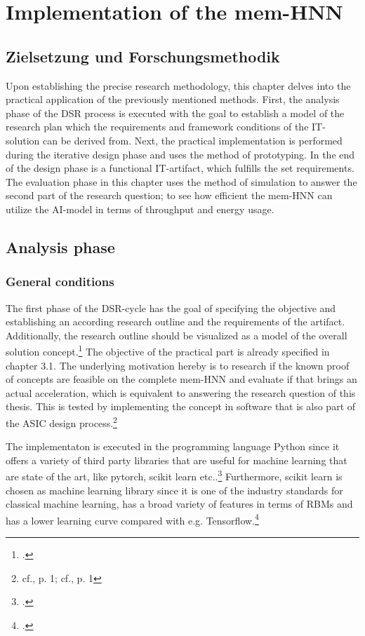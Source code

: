 \chapter{Implementation of the mem-HNN}

\section{Zielsetzung und Forschungsmethodik}
Upon establishing the precise research methodology, this chapter delves into the practical application of the previously mentioned methods.
First, the analysis phase of the \ac{DSR} process is executed with the goal to establish a model of the research plan 
which the requirements and framework conditions of the \ac{IT}-solution can be derived from. 
Next, the practical implementation is performed during the iterative design phase and uses the method of prototyping.
In the end of the design phase is a functional \ac{IT}-artifact, which fulfills the set requirements.
The evaluation phase in this chapter uses the method of simulation to answer the second part of the research question; to see how efficient 
the \ac{mem-HNN} can utilize the AI-model in terms of throughput and energy usage.

\section{Analysis phase}
\subsection{General conditions}
The first phase of the \ac{DSR}-cycle has the goal of specifying the objective and establishing an according research outline and the requirements of the artifact.
Additionally, the research outline should be visualized as a model of the overall solution concept.\footcite[cf.][278-279]{oesterleKonsortialforschung2010}
The objective of the practical part is already specified in chapter 3.1.
The underlying motivation hereby is to research if the known proof of concepts are feasible on the complete \ac{mem-HNN}
and evaluate if that brings an actual acceleration, which is equivalent to answering the research question of this thesis. 
This is tested by implementing the concept in software that is also part of the ASIC design process.\footnote{cf.\cite{raoUltimateGuideASIC}, p. 1; cf.\cite{ASICDesignFlow}, p. 1}

The implementaton is executed in the programming language Python since it offers a variety of third party libraries that are useful 
for machine learning that are state of the art, like pytorch, scikit learn etc..\footcite[cf.][306-307]{DiscreteContinuousModels}
Furthermore, scikit learn is chosen as machine learning library since it is one of the industry standards for classical machine learning, has a broad variety of features in terms of \ac{RBM}s
and has a lower learning curve compared with e.g. Tensorflow.\footcite[cf.][5-6]{raschkaMachineLearningPython2020}

